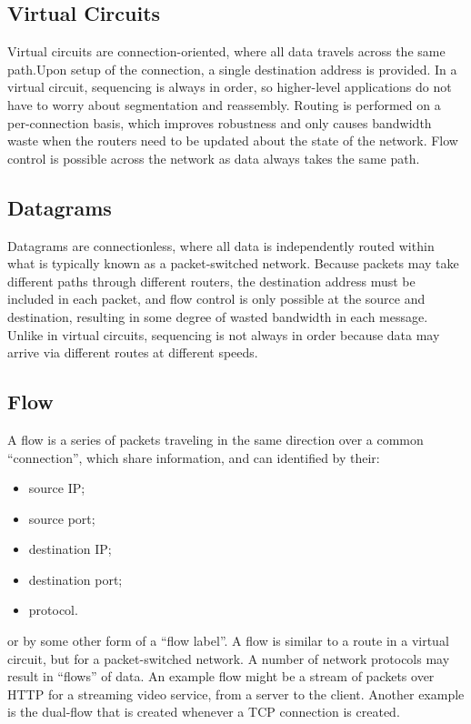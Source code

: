 \documentclass{article}
\begin{document}
\subsection{Virtual Circuits}
Virtual circuits are connection-oriented, where all data travels across the
same path.Upon setup of the connection, a single destination address is
provided. In a virtual circuit, sequencing is always in order, so higher-level
applications do not have to worry about segmentation and reassembly. Routing is
performed on a per-connection basis, which improves robustness and only causes
bandwidth waste when the routers need to be updated about the state of the
network. Flow control is possible across the network as data always takes the
same path. 

\subsection{Datagrams}
Datagrams are connectionless, where all data is independently routed within
what is typically known as a packet-switched network. Because packets may take
different paths through different routers, the destination address must be
included in each packet, and flow control is only possible at the source and
destination, resulting in some degree of wasted bandwidth in each message.
Unlike in virtual circuits, sequencing is not always in order because data may
arrive via different routes at different speeds.

\subsection{Flow}
A flow is a series of packets traveling in the same direction over a common
``connection'', which share information, and can identified by their:
\begin{itemize}
    \item source IP;
    \item source port;
    \item destination IP;
    \item destination port;
    \item protocol.
\end{itemize}
or by some other form of a ``flow label''. A flow is similar to a route in a
virtual circuit, but for a packet-switched network. A number of network
protocols may result in ``flows'' of data. An example flow might be a stream of
packets over HTTP for a streaming video service, from a server to the client.
Another example is the dual-flow that is created whenever a TCP connection is
created.
\end{document}
